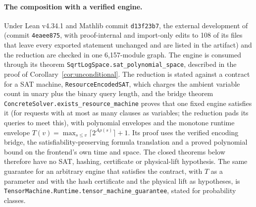 \documentclass[11pt]{article}
\theoremstyle{remark}
\newcommand{\lean}[1]{\texttt{#1}}
\begin{document}
\paragraph{The composition with a verified engine.}
Under Lean v4.34.1 and Mathlib commit \texttt{d13f23b7}, the external
development of~\cite{openai2026eth} (commit \texttt{4eaee875}, with
proof-internal and import-only edits to 108 of its files that leave
every exported statement unchanged and are listed in the artifact) and
the reduction
are checked in one 6{,}157-module graph. The engine is consumed through
its theorem \lean{SqrtLogSpace.sat\_polynomial\_space}, described in the
proof of Corollary~\ref{cor:unconditional}. The reduction is stated
against a contract for a SAT machine, \lean{ResourceEncodedSAT}, which
charges the ambient variable count in unary plus the binary query
length, and the bridge theorem
\lean{ConcreteSolver.exists\_resource\_machine} proves that one fixed
engine satisfies it (for requests with at most as many clauses as
variables; the reduction pads its queries to meet this), with polynomial
envelopes and the monotone runtime envelope
\(T(v)=\max_{s\le v}\lceil2^{A\rho(s)}\rceil+1\). Its proof uses the
verified encoding bridge, the satisfiability-preserving formula
translation and a proved polynomial bound on the frontend's own time and
space. The closed theorems below therefore have no SAT, hashing,
certificate or physical-lift hypothesis. The same guarantee for an
arbitrary engine that satisfies the contract, with \(T\) as a
parameter and with the hash certificate and the physical lift as
hypotheses, is \lean{TensorMachine.Runtime.tensor\_machine\_guarantee},
stated for probability classes.
\end{document}
